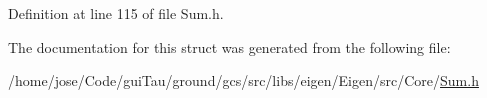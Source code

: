 Definition at line 115 of file Sum.\-h.



The documentation for this struct was generated from the following file\-:\begin{DoxyCompactItemize}
\item 
/home/jose/\-Code/gui\-Tau/ground/gcs/src/libs/eigen/\-Eigen/src/\-Core/\hyperlink{_sum_8h}{Sum.\-h}\end{DoxyCompactItemize}
